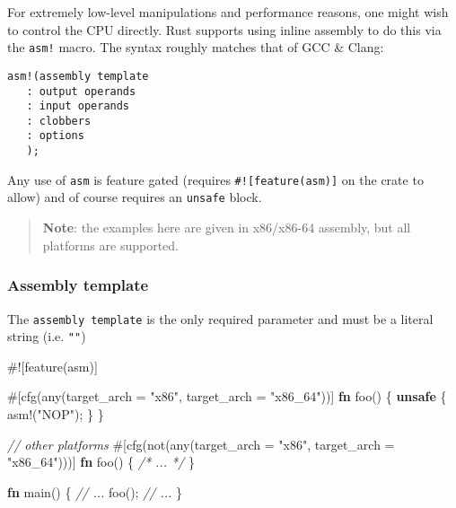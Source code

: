 \documentclass[a4paper,]{book}
\newenvironment{Shaded}{\begin{snugshade}}{\end{snugshade}}
\newcommand{\KeywordTok}[1]{\textcolor[rgb]{0.13,0.29,0.53}{\textbf{{#1}}}}
\newcommand{\StringTok}[1]{\textcolor[rgb]{0.31,0.60,0.02}{{#1}}}
\newcommand{\CommentTok}[1]{\textcolor[rgb]{0.56,0.35,0.01}{\textit{{#1}}}}
\newcommand{\OtherTok}[1]{\textcolor[rgb]{0.56,0.35,0.01}{{#1}}}
\newcommand{\NormalTok}[1]{{#1}}
\begin{document}
For extremely low-level manipulations and performance reasons, one might
wish to control the CPU directly. Rust supports using inline assembly to
do this via the \texttt{asm!} macro. The syntax roughly matches that of
GCC \& Clang:

\begin{verbatim}
asm!(assembly template
   : output operands
   : input operands
   : clobbers
   : options
   );
\end{verbatim}

Any use of \texttt{asm} is feature gated (requires
\texttt{\#!{[}feature(asm){]}} on the crate to allow) and of course
requires an \texttt{unsafe} block.

\begin{quote}
\textbf{Note}: the examples here are given in x86/x86-64 assembly, but
all platforms are supported.
\end{quote}

\subsubsection{Assembly template}\label{assembly-template}

The \texttt{assembly\ template} is the only required parameter and must
be a literal string (i.e. \texttt{""})

\begin{Shaded}
\begin{Highlighting}[]
\NormalTok{#![feature(asm)]}

\OtherTok{#[}\NormalTok{cfg}\OtherTok{(}\NormalTok{any}\OtherTok{(}\NormalTok{target_arch }\OtherTok{=} \StringTok{"x86"}\OtherTok{,} \NormalTok{target_arch }\OtherTok{=} \StringTok{"x86_64"}\OtherTok{))]}
\KeywordTok{fn} \NormalTok{foo() \{}
    \KeywordTok{unsafe} \NormalTok{\{}
        \OtherTok{asm!}\NormalTok{(}\StringTok{"NOP"}\NormalTok{);}
    \NormalTok{\}}
\NormalTok{\}}

\CommentTok{// other platforms}
\OtherTok{#[}\NormalTok{cfg}\OtherTok{(}\NormalTok{not}\OtherTok{(}\NormalTok{any}\OtherTok{(}\NormalTok{target_arch }\OtherTok{=} \StringTok{"x86"}\OtherTok{,} \NormalTok{target_arch }\OtherTok{=} \StringTok{"x86_64"}\OtherTok{)))]}
\KeywordTok{fn} \NormalTok{foo() \{ }\CommentTok{/* ... */} \NormalTok{\}}

\KeywordTok{fn} \NormalTok{main() \{}
    \CommentTok{// ...}
    \NormalTok{foo();}
    \CommentTok{// ...}
\NormalTok{\}}
\end{Highlighting}
\end{Shaded}
\end{document}

